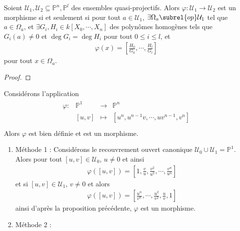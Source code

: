         \begin{prop}
            Soient $\mathcal{U}_1, \mathcal{U}_2 \subseteq \mathbb{P}^n, \mathbb{P}^l$ des ensembles quasi-projectifs. Alors $\varphi : \mathcal{U}_1 \to \mathcal{U}_2$ est un morphisme si et seulement si pour tout $a \in \mathcal{U}_1$, $\exists \Omega_a \subrel{op} \mathcal{U}_1$ tel que $a \in \Omega_a$, et $\exists G_i, H_i \in k[X_0, \cdots, X_n]$ des polynômes homogènes tels que $G_i(a) \neq 0$ et $\deg G_i = \deg H_i$ pour tout $0 \leq i \leq l$, et
            \begin{align*}
                \varphi(x) = \left[ \frac{H_0}{G_0}, \cdots, \frac{H_l}{G_l} \right]
            \end{align*}
            pour tout $x \in \Omega_a$.
        \end{prop}
        \begin{proof}
        \end{proof}
        \begin{expl}
            Considérons l'application 
            \begin{align*}
                \begin{array}{cccc}
                    \varphi : & \mathbb{P}^1 & \to & \mathbb{P}^n \\
                    & [u,v] & \mapsto & [u^n, u^{n-1}v, \cdots, uv^{n-1}, v^n]\\
                \end{array}
            \end{align*}
            Alors $\varphi$ est bien définie et est un morphisme. 
            \begin{enumerate}
                \item Méthode 1 : Considérons le recouvrement ouvert canonique $\mathcal{U}_0 \cup \mathcal{U}_1 = \mathbb{P}^1$. Alors pour tout  $[u,v] \in \mathcal{U}_0$, $u \neq 0$ et ainsi
                \begin{align*}
                    \varphi([u,v]) = \left[ 1, \frac vu, \frac{v^2}{u^2}, \cdots, \frac{v^n}{u^n} \right]
                \end{align*}
                et si $[u,v] \in \mathcal{U}_1$, $v \neq 0$ et alors 
                \begin{align*}
                    \varphi([u,v]) = \left[ \frac{u^n}{v^n}, \cdots, \frac{u^2}{v^2}, \frac uv, 1  \right]
                \end{align*}
                ainsi d'après la proposition précédente, $\varphi$ est un morphisme.
                \item Méthode 2 :  
            \end{enumerate}
        \end{expl}
